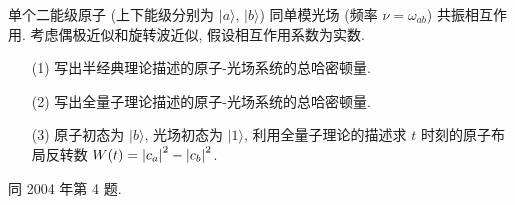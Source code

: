 \documentclass{assignment}
\begin{document}
\begin{prob}
    单个二能级原子 (上下能级分别为 $\lvert a\rangle$, $\lvert b\rangle$) 同单模光场 (频率 $\nu=\omega_{ab}$) 共振相互作用. 考虑偶极近似和旋转波近似, 假设相互作用系数为实数.
    \begin{itemize}
        \item[(1)] 写出半经典理论描述的原子-光场系统的总哈密顿量.
        \item[(2)] 写出全量子理论描述的原子-光场系统的总哈密顿量.
        \item[(3)] 原子初态为 $\lvert b\rangle$, 光场初态为 $\lvert 1\rangle$, 利用全量子理论的描述求 $t$ 时刻的原子布局反转数 $W(t)=\left\lvert c_a\right\rvert^2-\left\lvert c_b\right\rvert^2$.
    \end{itemize}
\end{prob}
\begin{sol}
    同 2004 年第 4 题.
\end{sol}
\end{document}
